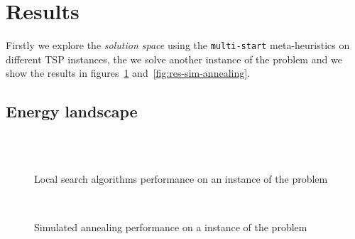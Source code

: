 \section{Results}\label{subsc:res}

Firstly we explore the \emph{solution space} using the \texttt{multi-start} meta-heuristics on different TSP instances, the we solve another instance of the problem and we show the results in figures~\ref{fig:res-local-search} and~\vref{fig:res-sim-annealing}.


\subsection{Energy landscape}\label{subsc:energy-land}








\begin{figure}
\centering
{} \,
 \\
 \,
\caption{Local search algorithms performance on an instance of the problem}
\label{fig:res-local-search}
\end{figure}

\begin{figure}
\centering
{} \,
\caption{Simulated annealing performance on a instance of the problem}
\label{fig:res-sim-annealing}
\end{figure}
